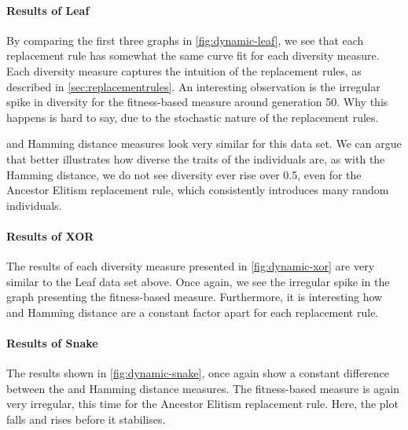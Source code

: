 \paragraph{Results of Leaf} By comparing the first three graphs in \cref{fig:dynamic-leaf}, we see that each replacement rule has somewhat the same curve fit for each diversity measure. Each diversity measure captures the intuition of the replacement rules, as described in \cref{sec:replacementrules}. An interesting observation is the irregular spike in diversity for the fitness-based measure around generation \num{50}. Why this happens is hard to say, due to the stochastic nature of the replacement rules.

\dia{} and Hamming distance measures look very similar for this data set. We can argue that \dia{} better illustrates how diverse the traits of the individuals are, as with the Hamming distance, we do not see diversity ever rise over \num{0.5}, even for the Ancestor Elitism replacement rule, which consistently introduces many random individuals. 



\paragraph{Results of XOR} The results of each diversity measure presented in \cref{fig:dynamic-xor} are very similar to the Leaf data set above. Once again, we see the irregular spike in the graph presenting the fitness-based measure. Furthermore, it is interesting how \dia{} and Hamming distance are a constant factor apart for each replacement rule.%



\paragraph{Results of Snake} The results shown in \cref{fig:dynamic-snake}, once again show a constant difference between the \dia{} and Hamming distance measures. The fitness-based measure is again very irregular, this time for the Ancestor Elitism replacement rule. Here, the plot falls and rises before it stabilises.

